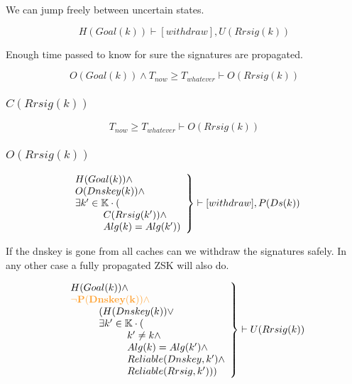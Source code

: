 \documentclass[twoside, a4paper]{article}
\newcommand{\highlightMinSig}[1]{\textcolor{MinSig}{\bf{#1}}}
\newcommand{\mathbox}[1]{#1}
\begin{document}
\mathbox{

	We can jump freely between uncertain states.
	
	\begin{equation}
		H(Goal(k)) \vdash [withdraw], U(Rrsig(k))
	\end{equation}

	Enough time passed to know for sure the signatures are propagated.
	
	\begin{equation}
		O(Goal(k)) \wedge T_{now} \geq T_{whatever} \vdash O(Rrsig(k))
	\end{equation}
}


\subsubsection{$C(Rrsig(k))$}
\highlightMinSig{
	\begin{equation}
		T_{now} \geq T_{whatever} \vdash O(Rrsig(k))
	\end{equation}
}

\subsubsection{$O(Rrsig(k))$}

\mathbox{

\highlightMinSig{
	\begin{equation}
		\left.
		\begin{array}{l}
\hskip 0cm				H(Goal(k)) \wedge \\
\hskip 0cm				O(Dnskey(k)) \wedge \\
\hskip 0cm				\exists k' \in \mathbb{K} \cdot (\\
\hskip 1cm					C(Rrsig(k')) \wedge \\
\hskip 1cm					Alg(k)=Alg(k'))\\
		\end{array}
		\right\} \vdash [withdraw], P(Ds(k)) \\
	\end{equation}
	}

	If the dnskey is gone from all caches can we withdraw the 
	signatures safely. In any other case a fully propagated ZSK will 
	also do.

	\begin{equation}
		\left.
		\begin{array}{l}
\hskip 0cm			H(Goal(k)) \wedge  \\
\highlightMinSig{\hskip 0cm			\neg P(Dnskey(k)) \wedge  }\\
\hskip 1cm			(H(Dnskey(k)) \vee \\
\hskip 1cm			\exists k' \in \mathbb{K} \cdot ( \\
\hskip 2cm				k' \not = k  \wedge\\
\hskip 2cm				Alg(k) = Alg(k')  \wedge\\
\hskip 2cm				Reliable(Dnskey, k')  \wedge\\
\hskip 2cm				Reliable(Rrsig, k')))
		\end{array}
		\right\} \vdash U(Rrsig(k))
	\end{equation}
}
\end{document}
